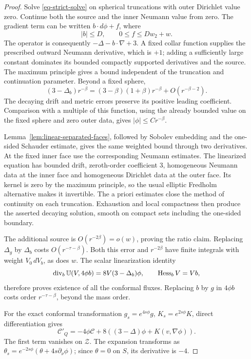\begin{proof}
Solve \eqref{eq-strict-solve} on spherical truncations with outer
Dirichlet value zero.  Continue both the source and the inner Neumann
value from zero.  The gradient term can be written \(b\cdot d\phi+f\),
where
\[
 |b|\leq D,\qquad 0\leq f\leq Dw_2+w .
\]
The operator is consequently \(-\Delta-b\cdot\nabla+3\).
A fixed collar function supplies the prescribed outward Neumann
derivative, which is \(+1\); adding a sufficiently large constant
dominates its bounded compactly supported derivatives and the source.
The maximum principle gives a bound independent of the truncation and
continuation parameter.  Beyond a fixed sphere,
\[
 (3-\Delta_b)r^{-\beta}
   =(3-\beta)(1+\beta)r^{-\beta}+O(r^{-\beta-2}).
\]
The decaying drift and metric errors preserve its positive leading
coefficient.  Comparison with a multiple of this function, using the
already bounded value on the fixed sphere and zero outer data, gives
\(|\phi|\leq C r^{-\beta}\).

Lemma~\ref{lem:linear-separated-faces}, followed by Sobolev embedding
and the one-sided Schauder estimate, gives the same weighted
bound through two derivatives.  At the fixed inner face use the
corresponding Neumann estimates.  The linearized equation has bounded
drift, zeroth-order coefficient \(3\), homogeneous Neumann data at the
inner face and homogeneous Dirichlet data at the outer face.  Its
kernel is zero by the maximum principle, so the usual elliptic
Fredholm alternative makes it invertible.  The a priori estimates
close the method of continuity on each truncation.  Exhaustion and
local compactness then produce the asserted decaying solution, smooth
on compact sets including the one-sided boundary.

The additional source is \(O(r^{-2\beta})=o(w)\), proving the ratio
claim.  Replacing \(\Delta_g\) by \(\Delta_b\) costs
\(O(r^{-\tau-\beta})\).  Both this error and \(r^{-2\beta}\) have
finite integrals with weight \(V_0\,dV_b\), as does \(w\).
The scalar linearization identity
\[
 \operatorname{div}_b\mathbb U(V,4\phi b)
       =8V(3-\Delta_b)\phi,\qquad \operatorname{Hess}_bV=Vb,
\]
therefore proves existence of all the conformal fluxes.
Replacing \(b\) by \(g\) in \(4\phi b\) costs order
\(r^{-\tau-\beta}\), beyond the mass order.

For the exact conformal transformation \(g_s=e^{4s\phi}g\),
\(K_s=e^{2s\phi}K\), direct differentiation gives
\[
 \mathcal C'_Q=-4\phi\mathcal C+
       8((3-\Delta)\phi+K(v,\nabla\phi)).
\]
The first term vanishes on \(\mathcal Z\).
The expansion transforms as
\(\theta_s=e^{-2s\phi}(\theta+4s\partial_\nu\phi)\);
since \(\theta=0\) on \(S\), its derivative is \(-4\).
\end{proof}

